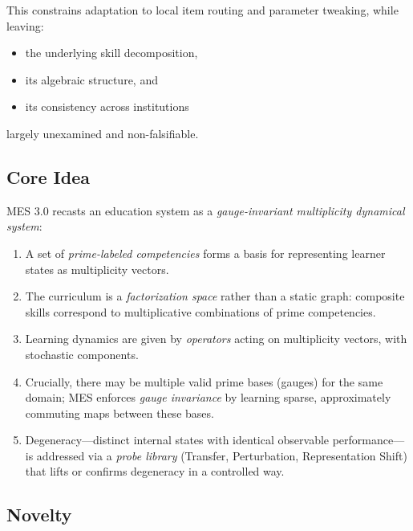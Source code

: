 \documentclass[11pt]{article}
\begin{document}
This constrains adaptation to local item routing and parameter tweaking, while leaving:
\begin{itemize}[itemsep=3pt]
  \item the underlying skill decomposition,
  \item its algebraic structure, and
  \item its consistency across institutions
\end{itemize}
largely unexamined and non-falsifiable.

\subsection{Core Idea}

MES 3.0 recasts an education system as a \emph{gauge-invariant multiplicity dynamical system}:
\begin{enumerate}[itemsep=3pt]
  \item A set of \emph{prime-labeled competencies} forms a basis for representing learner states as multiplicity vectors.
  \item The curriculum is a \emph{factorization space} rather than a static graph: composite skills correspond to multiplicative combinations of prime competencies.
  \item Learning dynamics are given by \emph{operators} acting on multiplicity vectors, with stochastic components.
  \item Crucially, there may be multiple valid prime bases (gauges) for the same domain; MES enforces \emph{gauge invariance} by learning sparse, approximately commuting maps between these bases.
  \item Degeneracy---distinct internal states with identical observable performance---is addressed via a \emph{probe library} (Transfer, Perturbation, Representation Shift) that lifts or confirms degeneracy in a controlled way.
\end{enumerate}

\subsection{Novelty}
\end{document}
